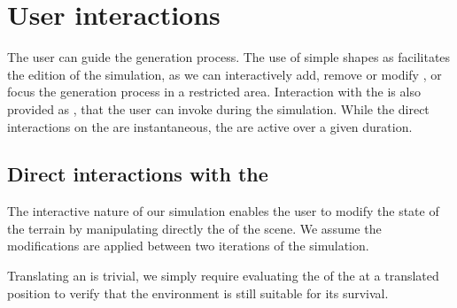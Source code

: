 


\section{User interactions}
\label{sec:env-obj-interaction}
The user can guide the generation process. The use of simple shapes as  facilitates the edition of the simulation, as we can interactively add, remove or modify , or focus the generation process in a restricted area. Interaction with the  is also provided as , that the user can invoke during the simulation. While the direct interactions on the  are instantaneous, the  are active over a given duration.

\subsection{Direct interactions with the }
\label{sec:env-obj-manual-interaction}
The interactive nature of our simulation enables the user to modify the state of the terrain by manipulating directly the  of the scene. We assume the modifications are applied between two iterations of the simulation.

Translating an  is trivial, we simply require evaluating the  of the  at a translated position to verify that the environment is still suitable for its survival.

